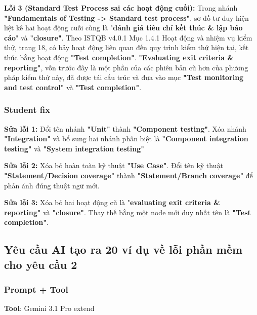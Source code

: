 \vspace{0.2cm}

\textbf{Lỗi 3 (Standard Test Process sai các hoạt động cuối):} Trong nhánh \textbf{"Fundamentals of Testing -> Standard test process"}, sơ đồ tư duy hiện liệt kê hai hoạt động cuối cùng là "\textbf{đánh giá tiêu chí kết thúc \& lập báo cáo}" và \textbf{"closure"}. Theo ISTQB v4.0.1 Mục 1.4.1 Hoạt động và nhiệm vụ kiểm thử, trang 18, có bảy hoạt động liên quan đến quy trình kiểm thử hiện tại, kết thúc bằng hoạt động \textbf{"Test completion"}. \textbf{"Evaluating exit criteria \& reporting"}, vốn trước đây là một phần của các phiên bản cũ hơn của phương pháp kiểm thử này, đã được tái cấu trúc và đưa vào mục \textbf{"Test monitoring and test control"} và \textbf{"Test completion"}.

\subsubsection{Student fix}
\textbf{Sửa lỗi 1:} Đổi tên nhánh \textbf{"Unit"} thành \textbf{"Component testing"}. Xóa nhánh \textbf{"Integration"} và bổ sung hai nhánh phân biệt là \textbf{"Component integration testing"} và \textbf{"System integration testing"}

\vspace{0.2cm}

\textbf{Sửa lỗi 2:} Xóa bỏ hoàn toàn kỹ thuật \textbf{"Use Case"}. Đổi tên kỹ thuật \textbf{"Statement/Decision coverage"} thành \textbf{"Statement/Branch coverage"} để phản ánh đúng thuật ngữ mới.

\vspace{0.2cm}

\textbf{Sửa lỗi 3:} Xóa bỏ hai hoạt động cũ là "\textbf{evaluating exit criteria \& reporting"} và \textbf{"closure"}. Thay thế bằng một node mới duy nhất tên là \textbf{"Test completion"}.
 

\subsection{Yêu cầu AI tạo ra 20 ví dụ về lỗi phần mềm cho yêu cầu 2}

\subsubsection{Prompt + Tool}
\textbf{Tool}: Gemini 3.1 Pro extend


